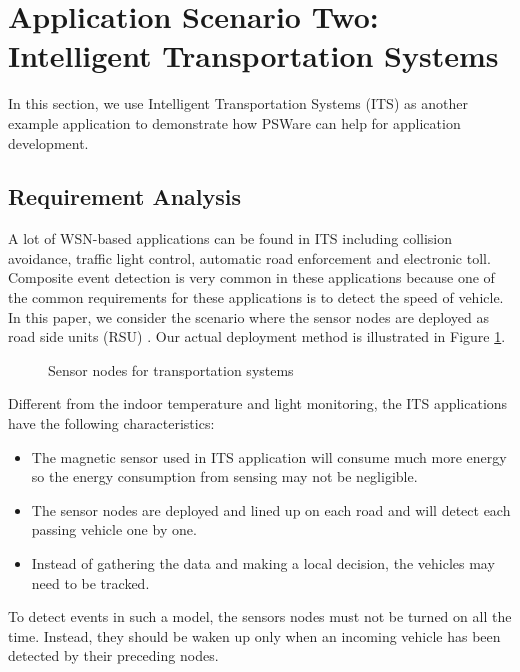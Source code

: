 \section{Application Scenario Two: Intelligent Transportation Systems}
\label{sec:its}
In this section, we use Intelligent Transportation Systems (ITS) as another example application to demonstrate how PSWare can help for application development.

\subsection{Requirement Analysis}
A lot of WSN-based applications can be found in ITS including collision avoidance, traffic light control, automatic road enforcement and electronic toll. Composite event detection is very common in these applications because one of the common requirements for these applications is to detect the speed of vehicle. In this paper, we consider the scenario where the sensor nodes are deployed as road side units (RSU) \cite{klein:its}. Our actual deployment method is illustrated in Figure \ref{fig:itsSensor}.

\begin{figure}
\centering
{}
\caption{Sensor nodes for transportation systems}
\label{fig:itsSensor}
\end{figure}

Different from the indoor temperature and light monitoring, the ITS applications have the following characteristics:
\begin{itemize}
\item The magnetic sensor used in ITS application will consume much more energy so the energy consumption from sensing may not be negligible.
\item The sensor nodes are deployed and lined up on each road and will detect each passing vehicle one by one.
\item Instead of gathering the data and making a local decision, the vehicles may need to be tracked. 
\end{itemize}
To detect events in such a model, the sensors nodes must not be turned on all the time. Instead, they should be waken up only when an incoming vehicle has been detected by their preceding nodes.

